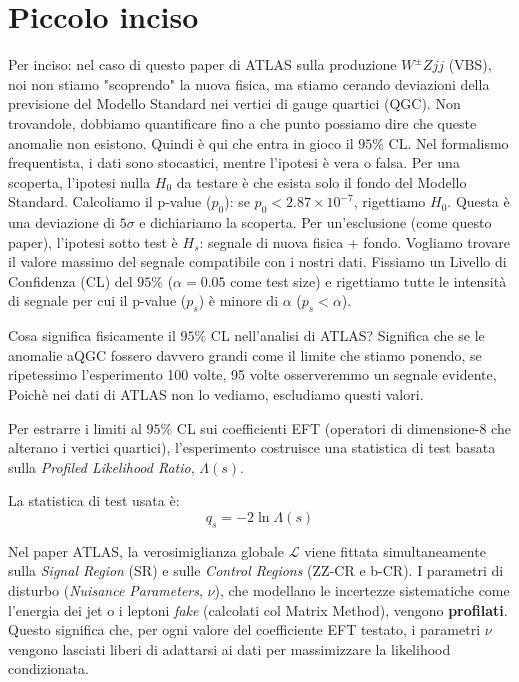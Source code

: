 \documentclass[11pt]{article}
\begin{document}
\section{Piccolo inciso}
Per inciso: nel caso di questo paper di ATLAS sulla produzione $W^\pm Z jj$ (VBS), noi non stiamo "scoprendo" la nuova fisica, ma stiamo cerando deviazioni della previsione del Modello Standard nei vertici di gauge quartici (QGC). Non trovandole, dobbiamo quantificare fino a che punto possiamo dire che queste anomalie non esistono. Quindi è qui che entra in gioco il $95\%$ CL. Nel formalismo frequentista, i dati sono stocastici, mentre l'ipotesi è vera o falsa. Per una scoperta, l'ipotesi nulla $H_0$ da testare è che esista solo il fondo del Modello Standard. Calcoliamo il p-value ($p_0$): se $p_0<2.87\times10^{-7}$, rigettiamo $H_0$. Questa è una deviazione di $5\sigma$ e dichiariamo la scoperta. Per un'esclusione (come questo paper), l'ipotesi sotto test è $H_s$: segnale di nuova fisica + fondo. Vogliamo trovare il valore massimo del segnale compatibile con i nostri dati. Fissiamo un Livello di Confidenza (CL) del $95\%$ ($\alpha=0.05$ come test size) e rigettiamo tutte le intensità di segnale per cui il p-value ($p_s$) è minore di $\alpha$ ($p_s<\alpha$).

Cosa significa fisicamente il $95\%$ CL nell'analisi di ATLAS? Significa che se le anomalie aQGC fossero davvero grandi come il limite che stiamo ponendo, se ripetessimo l'esperimento 100 volte, 95 volte osserveremmo un segnale evidente, Poichè nei dati di ATLAS non lo vediamo, escludiamo questi valori.

Per estrarre i limiti al $95\%$ CL sui coefficienti EFT (operatori di dimensione-8 che alterano i vertici quartici), l'esperimento costruisce una statistica di test basata sulla \textit{Profiled Likelihood Ratio}, $\Lambda(s)$. 

La statistica di test usata è:
\begin{equation}
q_s = -2 \ln \Lambda(s)
\end{equation}

Nel paper ATLAS, la verosimiglianza globale $\mathcal{L}$ viene fittata simultaneamente sulla \textit{Signal Region} (SR) e sulle \textit{Control Regions} (ZZ-CR e b-CR). I parametri di disturbo (\textit{Nuisance Parameters}, $\nu$), che modellano le incertezze sistematiche come l'energia dei jet o i leptoni \textit{fake} (calcolati col Matrix Method), vengono \textbf{profilati}. Questo significa che, per ogni valore del coefficiente EFT testato, i parametri $\nu$ vengono lasciati liberi di adattarsi ai dati per massimizzare la likelihood condizionata.
\end{document}
